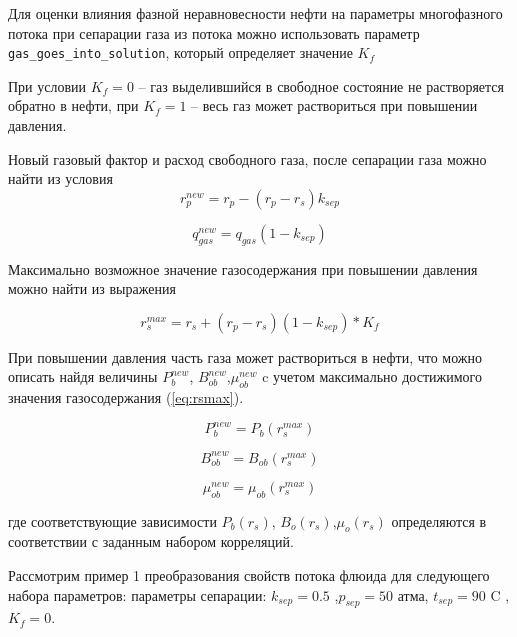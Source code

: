 Для оценки влияния фазной неравновесности нефти на параметры многофазного потока при сепарации газа из потока можно использовать параметр \texttt{gas_goes_into_solution}, который определяет значение   $K_f$

При условии $K_f = 0$ -- газ выделившийся в свободное состояние не растворяется обратно в нефти, при $K_f = 1$ -- весь газ может раствориться при повышении давления.

Новый газовый фактор и расход свободного газа, после сепарации газа можно найти из условия
\begin{equation}
	r_p^{new} = r_p - \left( r_p - r_s \right) k_{sep} 
\end{equation}

\begin{equation}
q_{gas}^{new} = q_{gas}(1-k_{sep}) 
\end{equation}

Максимально возможное значение газосодержания при повышении давления можно найти из выражения

\begin{equation} 
	r_s^{max} = r_s + \left( r_p - r_s \right) (1 - k_{sep}) *K_f 
	\label{eq:rsmax}
\end{equation}

При повышении давления часть газа может раствориться в нефти, что можно описать найдя величины $P_{b}^{new}$, $B_{ob}^{new}$,$\mu_{ob}^{new}$ c учетом максимально достижимого значения газосодержания (\ref{eq:rsmax}).

$$P_{b}^{new} = P_b(r_s^{max}) $$

$$B_{ob}^{new} = B_{ob}(r_s^{max}) $$

$$\mu_{ob}^{new} = \mu_{ob}(r_s^{max}) $$

где соответствующие зависимости $P_{b}(r_s)$, $B_{o}(r_s)$,$\mu_{o}(r_s)$ определяются в соответствии с заданным набором корреляций.

Рассмотрим пример 1 преобразования свойств потока флюида для следующего набора параметров:
параметры сепарации:  $k_{sep} = 0.5$ ,$p_{sep} = 50$   атма,	$t_{sep} = 90$   C ,$K_f = 0 $.    



